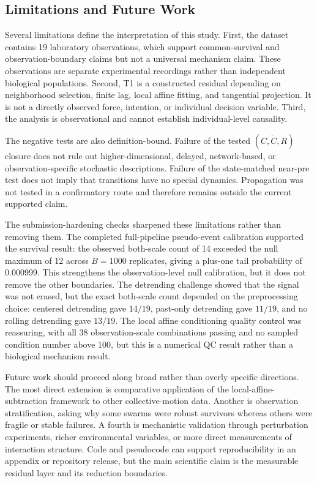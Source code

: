 \subsection{Limitations and Future Work}

Several limitations define the interpretation of this study. First, the
dataset contains 19 laboratory observations, which support common-survival and
observation-boundary claims but not a universal mechanism claim. These
observations are separate experimental recordings rather than independent
biological populations. Second, T1 is a constructed residual depending on
neighborhood selection, finite lag, local affine fitting, and tangential
projection. It is not a directly observed force, intention, or individual
decision variable. Third, the analysis is observational and cannot establish
individual-level causality.

The negative tests are also definition-bound. Failure of the tested
$(C,\dot{C},R)$ closure does not rule out higher-dimensional, delayed,
network-based, or observation-specific stochastic descriptions. Failure of the
state-matched near-pre test does not imply that transitions have no special
dynamics. Propagation was not tested in a confirmatory route and therefore
remains outside the current supported claim.

The submission-hardening checks sharpened these limitations rather than
removing them. The completed full-pipeline pseudo-event calibration supported
the survival result: the observed both-scale count of 14 exceeded the null
maximum of 12 across $B=1000$ replicates, giving a plus-one tail probability
of 0.000999. This strengthens the observation-level null calibration, but it
does not remove the other boundaries. The detrending challenge showed that
the signal was not erased, but the exact both-scale count depended on the
preprocessing choice: centered detrending gave $14/19$, past-only detrending
gave $11/19$, and no rolling detrending gave $13/19$. The local affine
conditioning quality control was reassuring, with all 38 observation-scale
combinations passing and no sampled condition number above 100, but this is a
numerical QC result rather than a biological mechanism result.

Future work should proceed along broad rather than overly specific directions.
The most direct extension is comparative application of the
local-affine-subtraction framework to other collective-motion data. Another is
observation stratification, asking why some swarms were robust survivors
whereas others were fragile or stable failures. A fourth is mechanistic
validation through perturbation experiments, richer environmental variables,
or more direct measurements of interaction structure. Code and pseudocode can
support reproducibility in an appendix or repository release, but the main
scientific claim is the measurable residual layer and its reduction
boundaries.
